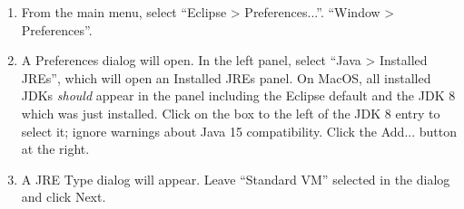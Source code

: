 \begin{enumerate}

\item From the main menu, select 
\ifMacOS
``{\sf Eclipse > Preferences...}''.
\else
``{\sf Window > Preferences}''.
\fi

\item A {\sf Preferences} dialog will open. In the left panel, select
``{\sf Java > Installed JREs}'', which will open an {\sf Installed JREs}
panel.
\ifMacOS %
On MacOS, all installed JDKs {\it should} appear in the panel
including the Eclipse default and the JDK 8 which was just installed.
Click on the box to the left of the JDK 8 entry to select it;
ignore warnings about Java 15 compatibility. 
\else %
Click the {\sf Add...} button at the right.

\item A {\sf JRE Type} dialog will appear. Leave ``Standard VM''
selected in the dialog and click {\sf Next}.


\end{enumerate}
